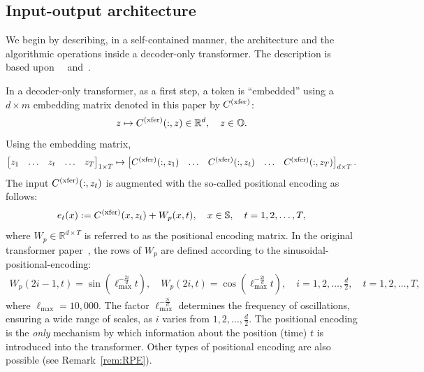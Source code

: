 \documentclass[twoside,11pt]{article}
\def\Re{\mathbb{R}}
\newcommand{\field}[1]{\mathbb{#1}}
\def\Re{\field{R}}
\def\bS{\begin{slide}}
\def\Re{\mathbb{R}}
\renewcommand{\Re}{\mathbb{R}}
\def\bS{\mathbb{S}}
\def\bO{\mathbb{O}}
\def\xfer{{\text{\rm (xfer)}}}
\begin{document}
\subsection{Input-output architecture}
\label{sec:main_xfer}

We begin by describing, in a self-contained manner, the architecture
and the algorithmic operations inside a decoder-only transformer.
The description is based
upon~\citep{phuong2022formal}~\cite[Ch.~10]{jm3} and~\citep{raschka2024build}.

In a decoder-only transformer, as a first step, a token is ``embedded'' using a $d\times m$ embedding
matrix denoted in this paper by $C^\xfer$:
\begin{equation*}
z \mapsto C^\xfer (:,z) \in \Re^d,\quad z\in\bO.
\end{equation*}
Using the embedding matrix,
\begin{equation*}
\begin{bmatrix} z_1 & \hdots & z_t & \hdots &
  z_T \end{bmatrix}_{1\times T}  \mapsto \begin{bmatrix} C^\xfer (:,z_1) & \hdots & C^\xfer (:,z_t) & \hdots & C^\xfer (:,z_T) \end{bmatrix}_{d\times T}.
\end{equation*}
The input $C^\xfer (:,z_t)$ is augmented with the so-called positional
encoding as follows:
\begin{equation*}
e_t(x) := C^\xfer(x,z_t) + W_p(x,t),\quad x\in\bS, \quad t=1,2,\hdots,T,
\end{equation*}
where $W_p \in \Re^{d\times T}$ is referred to as the positional encoding matrix.  In
the original transformer paper~\citep{vaswani2017attention}, the rows of $W_p$ are defined
according to the sinusoidal-positional-encoding:
\begin{align*}
  W_p(2i-1,t) = \sin(\ell_{\text{max}}^{-\frac{2i}{d}} t),\quad 
  W_p(2i,t)  = \cos(\ell_{\text{max}}^{-\frac{2i}{d}} t), \quad
  i=1,2,\hdots,\frac{d}{2},\quad t=1,2,\hdots,T,
\end{align*}
where $\ell_{\text{max}} = 10,000$.  The factor
$\ell_{\text{max}}^{-\frac{2i}{d}}$ determines the frequency of
oscillations, ensuring a wide range of scales, as $i$ varies from
$1,2,\hdots,\frac{d}{2}$.  The positional encoding is the {\em only}
mechanism by which information about the position (time) $t$ is introduced
into the transformer. 
Other types of positional encoding are also possible (see Remark~\ref{rem:RPE}).
\end{document}
